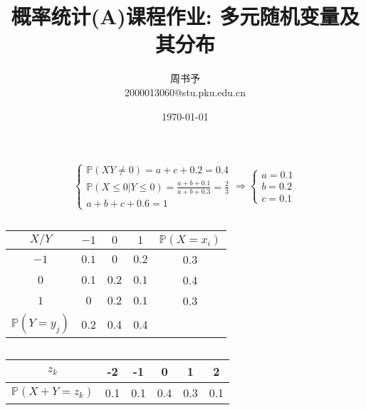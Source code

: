 \documentclass[8pt]{article}
\title{\heiti\zihao{2} 概率统计(A)课程作业: 多元随机变量及其分布}
\author{\kaishu\zihao{-3} 周书予\\2000013060@stu.pku.edu.cn}
\date{\today}
\theoremstyle{compact}
\def\le{\leqslant}
\def\P#1{\mathbb{P}\left({#1}\right)}
\begin{document}
\pagestyle{plain}

\maketitle

\section{}
\subsection{}
$$\begin{cases}
		\P{XY \neq 0} = a + c + 0.2 = 0.4\\
		\P{X \le 0 | Y \le 0} = \frac{a + b + 0.1}{a + b + 0.3} = \frac23\\
		a + b + c + 0.6 = 1
	\end{cases}
	\Rightarrow
	\begin{cases}
		a = 0.1 \\ b = 0.2 \\ c = 0.1
	\end{cases}$$
\subsection{}
	\begin{center}
	\begin{tabular}{c|cccc}
		$X / Y$ & $-1$ & $0$ & $1$ & $\P{X = x_i}$ \\
		\hline
		$-1$ & $0.1$ & $0$   & $0.2$ & 0.3\\
		$0$  & $0.1$ & $0.2$ & $0.1$ & 0.4\\
		$1$  & $0$   & $0.2$ & $0.1$ & 0.3\\
		$\P{Y = y_j}$ & 0.2 & 0.4 & 0.4 &
	\end{tabular}
	\end{center}
\subsection{}
\begin{center}
	\begin{tabular}{c|ccccc}
		$z_k$ & -2 & -1 & 0 & 1 & 2\\
		\hline
		$\P{X + Y = z_k}$ & 0.1 & 0.1 & 0.4 & 0.3 & 0.1
	\end{tabular}
\end{center}
\end{document}
